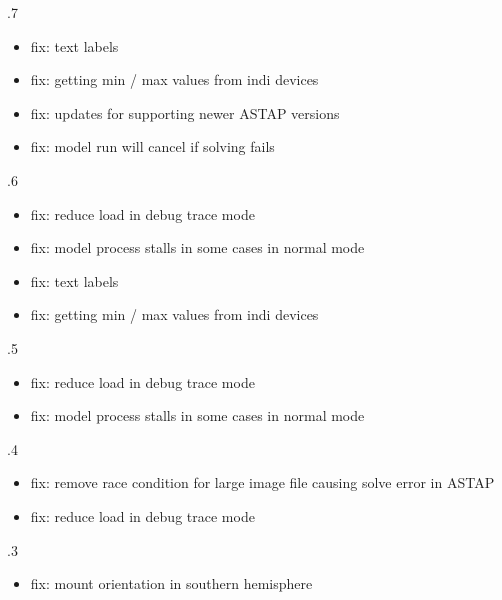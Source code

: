 \documentclass[a4paper,10pt,english]{sphinxmanual}
\begin{document}
.7
\begin{itemize}
\item {} 
\sphinxAtStartPar
fix: text labels

\item {} 
\sphinxAtStartPar
fix: getting min / max values from indi devices

\item {} 
\sphinxAtStartPar
fix: updates for supporting newer ASTAP versions

\item {} 
\sphinxAtStartPar
fix: model run will cancel if solving fails

\end{itemize}

.6
\begin{itemize}
\item {} 
\sphinxAtStartPar
fix: reduce load in debug trace mode

\item {} 
\sphinxAtStartPar
fix: model process stalls in some cases in normal mode

\item {} 
\sphinxAtStartPar
fix: text labels

\item {} 
\sphinxAtStartPar
fix: getting min / max values from indi devices

\end{itemize}

.5
\begin{itemize}
\item {} 
\sphinxAtStartPar
fix: reduce load in debug trace mode

\item {} 
\sphinxAtStartPar
fix: model process stalls in some cases in normal mode

\end{itemize}

.4
\begin{itemize}
\item {} 
\sphinxAtStartPar
fix: remove race condition for large image file causing solve error in ASTAP

\item {} 
\sphinxAtStartPar
fix: reduce load in debug trace mode

\end{itemize}

.3
\begin{itemize}
\item {} 
\sphinxAtStartPar
fix: mount orientation in southern hemisphere

\end{itemize}
\end{document}
